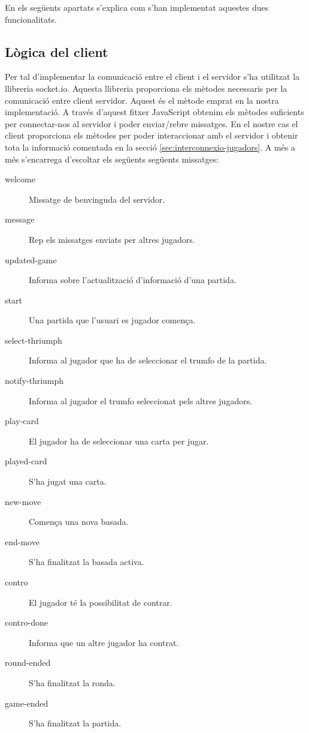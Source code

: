 En els següents apartats s'explica com s'han implementat aquestes dues funcionalitats. 

\subsection{Lògica del client}

Per tal d'implementar la comunicació entre el client i el servidor s'ha utilitzat la llibreria socket.io. Aquesta llibreria proporciona els mètodes necessaris per la comunicació entre client servidor. Aquest és el mètode emprat en la nostra implementació. A través d'aquest fitxer JavaScript obtenim els mètodes suficients per connectar-nos al servidor i poder enviar/rebre missatges. En el nostre cas el client proporciona els mètodes per poder interaccionar amb el servidor i obtenir tota la informació comentada en la secció \ref{sec:interconnexio-jugadors}. A més a més s'encarrega d'escoltar els següents següents missatges: 

\begin{description}
\item[welcome]{Missatge de benvinguda del servidor.}
\item[message]{Rep els missatges enviats per altres jugadors.}
\item[updated-game]{Informa sobre l'actualització d'informació d'una partida. }
\item[start]{Una partida que l'usuari es jugador comença.}
\item[select-thriumph]{Informa al jugador que ha de seleccionar el trumfo de la partida. }
\item[notify-thriumph]{Informa al jugador el trumfo seleccionat pels altres jugadors.}
\item[play-card]{El jugador ha de seleccionar una carta per jugar. }
\item[played-card]{S'ha jugat una carta.}
\item[new-move]{Comença una nova basada.}
\item[end-move]{S'ha finalitzat la basada activa.}
\item[contro]{El jugador té la possibilitat de contrar.}
\item[contro-done]{Informa que un altre jugador ha contrat.}
\item[round-ended]{S'ha finalitzat la ronda.}
\item[game-ended]{S'ha finalitzat la partida.}
\end{description}

